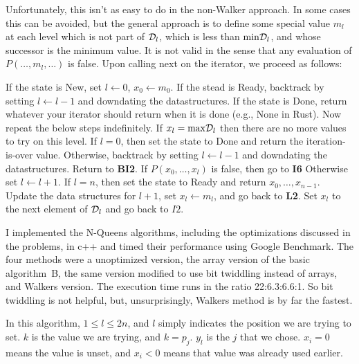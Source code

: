 Unfortunately, this isn't as easy to do in the non-Walker approach.  In some
cases this can be avoided, but the general approach is to define some special
value $m_l$ at each level which is not part of ${\cal D}_l$, which is less
than ${\rm min} {\cal D}_l$, and whose successor is the minimum value.
It is not valid in the sense that any evaluation of $P\left(\ldots, m_l, \ldots\right)$ 
is false.  Upon calling next on the iterator, we proceed as follows:

\vskip 0.1in
 If the state is New, set $l \leftarrow 0$, $x_0 \leftarrow m_0$.
If the stead is Ready, backtrack by setting $l \leftarrow l - 1$ and downdating
the datastructures.  If the state is Done, return whatever your iterator should
return when it is done (e.g., None in Rust).
\vskip 0.05in
 Now repeat the below steps indefinitely.
 If $x_l = {\rm max} {\cal D}_l$ then there are no more values
  to try on this level.  If $l = 0$, then set the state to Done and return the
  iteration-is-over value.  Otherwise, backtrack by setting $l \leftarrow l - 1$
  and downdating the datastructures.  Return to {\bf BI2}.
\vskip 0.05in
 If $P\left(x_0, \ldots, x_l\right)$ is false, then go to {\bf I6}
  Otherwise set $l \leftarrow l + 1$.  If $l = n$, then set the state to Ready 
  and return $x_0, \ldots, x_{n-1}$.
\vskip 0.05in
 Update the data structures for $l + 1$, set $x_l \leftarrow m_l$,
  and go back to {\bf L2}.
\vskip 0.05in
 Set $x_l$ to the next element of ${\cal D}_l$ and go back to $I2$.
\vskip 0.1in

\noindent I implemented the N-Queens algorithms, including the optimizations
discussed in the problems, in c++ and timed their performance using
Google Benchmark.  The four methods were a  unoptimized
version, the array version of the basic algorithm~B, the
same version modified to use bit twiddling instead of arrays,
and Walkers version.  The execution time runs in the ratio
22:6.3:6.6:1.  So bit twiddling is not helpful, but, unsurprisingly,
Walkers method is by far the fastest.

\vskip 0.1in

\noindent In this algorithm, $1 \le l \le 2n$, and $l$ simply indicates the position
we are trying to set.  $k$ is the value we are trying, and $k = p_j$.
$y_l$ is the $j$ that we chose.  $x_i = 0$ means the value is unset,
and $x_i < 0$ means that value was already used earlier.

